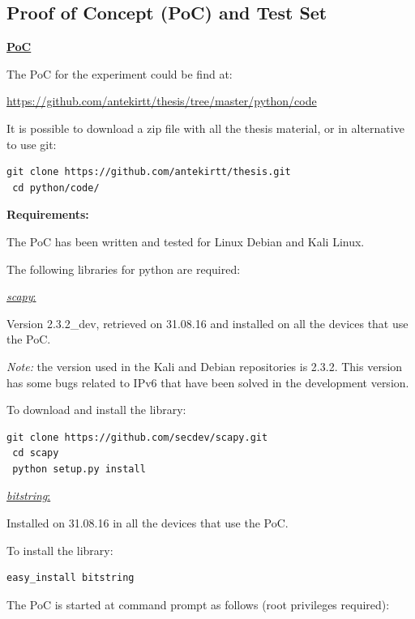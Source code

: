 \documentclass[12pt]{article}
\begin{document}
\subsection{Proof of Concept (PoC) and Test Set}
\label{PoCandTest}

\textbf{\underline{PoC}}

The PoC for the experiment could be find at:

\vspace{-10pt}
\url{https://github.com/antekirtt/thesis/tree/master/python/code}

It is possible to download a zip file with all the thesis material, or in alternative to use git:

\begin{lstlisting}[style=python,basicstyle=\ttfamily\footnotesize]
 git clone https://github.com/antekirtt/thesis.git
 cd python/code/
\end{lstlisting}

\vspace{-15pt}
\textbf{Requirements:}

\vspace{-15pt}
The PoC has been written and tested for Linux Debian and Kali Linux.

The following libraries for python are required:

\vspace{-10pt}
\underline{\textit{scapy}:}

Version 2.3.2_dev, retrieved on 31.08.16 and installed on all the devices that use the PoC.

\textit{Note:} the version used in the Kali and Debian repositories is 2.3.2. This version has some bugs related to IPv6 that have been solved in the development version.

To download and install the library:
\begin{lstlisting}[style=python,basicstyle=\ttfamily\footnotesize]
 git clone https://github.com/secdev/scapy.git
 cd scapy
 python setup.py install
\end{lstlisting}

\underline{\textit{bitstring}:}

Installed on 31.08.16 in all the devices that use the PoC.

To install the library:
\begin{lstlisting}[style=python,basicstyle=\ttfamily\footnotesize]
 easy_install bitstring
\end{lstlisting}

The PoC is started at command prompt as follows (root privileges required):
\end{document}
